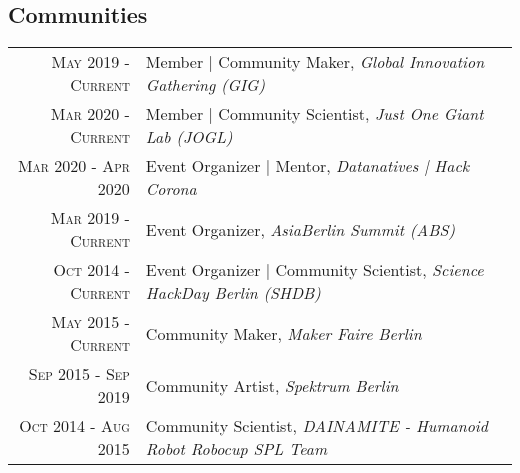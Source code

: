 \subsection{Communities}
\begin{longtable}
	{r|p{13cm}}
	\textsc{May 2019 - Current}  & Member | Community Maker, \emph{Global Innovation Gathering (GIG)}\\
	\textsc{Mar 2020 - Current}  & Member | Community Scientist, \emph{Just One Giant Lab (JOGL)}\\
	\textsc{Mar 2020 - Apr 2020} & Event Organizer | Mentor, \emph{Datanatives | Hack Corona}\\
	\textsc{Mar 2019 - Current}  & Event Organizer, \emph{AsiaBerlin Summit (ABS)}\\
	\textsc{Oct 2014 - Current}  & Event Organizer | Community Scientist, \emph{Science HackDay Berlin (SHDB)}\\
	\textsc{May 2015 - Current}  & Community Maker, \emph{Maker Faire Berlin}\\
	\textsc{Sep 2015 - Sep 2019} & Community Artist, \emph{Spektrum Berlin}\\
	\textsc{Oct 2014 - Aug 2015} & Community Scientist, \emph{DAINAMITE - Humanoid Robot Robocup SPL Team}\\
\end{longtable}
